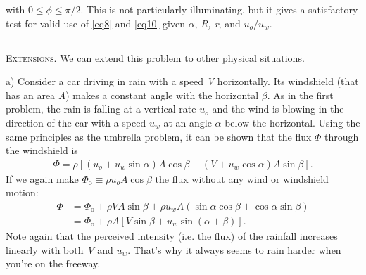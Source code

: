 \documentclass[11pt]{article}
\begin{document}
with $0 \leq \phi \leq \pi/2$. This is not particularly illuminating, but it gives a satisfactory test for valid use of \eqref{eq8} and \eqref{eq10} given $\alpha$, \textit{R, r}, and $u_o / u_w$.


\subsection[Extensions]{} \textsc{\underline{Extensions}}. We can extend this problem to other physical situations. 

\vspace{10pt} a) Consider a car driving in rain with a speed \textit{V} horizontally. Its windshield (that has an area \textit{A}) makes a constant angle with the horizontal $\beta$. As in the first problem, the rain is falling at a vertical rate $u_o$ and the wind is blowing in the direction of the car with a speed $u_w$ at an angle $\alpha$ below the horizontal. Using the same principles as the umbrella problem, it can be shown that the flux $\Phi$ through the windshield is
\begin{align} \label{eq11}
\Phi = \rho[(u_o + u_w \sin{\alpha})A\cos{\beta} + (V + u_w \cos{\alpha})A\sin{\beta}].
\end{align}
If we again make $\Phi_{\text{o}} \equiv \rho u_o A \cos{\beta}$ the flux without any wind or windshield motion:
\begin{align} \label{eq12}
\Phi &= \Phi_{\text{o}} + \rho VA\sin{\beta} + \rho u_w A (\sin{\alpha}\cos{\beta} + \cos{\alpha}\sin{\beta}) \nonumber \\ 
&= \Phi_{\text{o}} + \rho A [V\sin{\beta} + u_w \sin{(\alpha + \beta)}].
\end{align}
Note again that the perceived intensity (i.e. the flux) of the rainfall increases linearly with both \textit{V} and $u_w$. That's why it always seems to rain harder when you're on the freeway.
\end{document}
